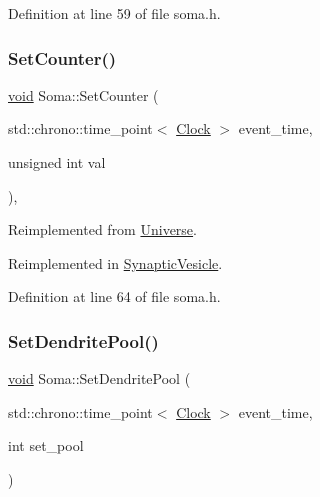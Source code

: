 Definition at line 59 of file soma.\+h.

\mbox{\label{class_soma_a9ef49d3fea8c0fbe6513f3910339f736}} 
\subsubsection{\texorpdfstring{Set\+Counter()}{SetCounter()}}
{\footnotesize\ttfamily \mbox{\hyperlink{glad_8h_a950fc91edb4504f62f1c577bf4727c29}{void}} Soma\+::\+Set\+Counter (\begin{DoxyParamCaption}\item[{std\+::chrono\+::time\+\_\+point$<$ \mbox{\hyperlink{universe_8h_a0ef8d951d1ca5ab3cfaf7ab4c7a6fd80}{Clock}} $>$}]{event\+\_\+time,  }\item[{unsigned int}]{val }\end{DoxyParamCaption})\hspace{0.3cm}{\ttfamily [inline]}, {\ttfamily [virtual]}}



Reimplemented from \mbox{\hyperlink{class_universe_aa22202ae740eb1355529afcb13285e91}{Universe}}.



Reimplemented in \mbox{\hyperlink{class_synaptic_vesicle_a7fd7cfce5eccb904206d968866f85220}{Synaptic\+Vesicle}}.



Definition at line 64 of file soma.\+h.

\mbox{\label{class_soma_a08260f4dfa8f736611fb924cfd03c4ec}} 
\subsubsection{\texorpdfstring{Set\+Dendrite\+Pool()}{SetDendritePool()}}
{\footnotesize\ttfamily \mbox{\hyperlink{glad_8h_a950fc91edb4504f62f1c577bf4727c29}{void}} Soma\+::\+Set\+Dendrite\+Pool (\begin{DoxyParamCaption}\item[{std\+::chrono\+::time\+\_\+point$<$ \mbox{\hyperlink{universe_8h_a0ef8d951d1ca5ab3cfaf7ab4c7a6fd80}{Clock}} $>$}]{event\+\_\+time,  }\item[{int}]{set\+\_\+pool }\end{DoxyParamCaption})\hspace{0.3cm}{\ttfamily [inline]}}



